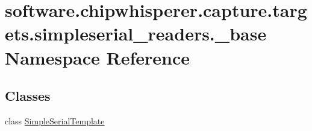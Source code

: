 \hypertarget{namespacesoftware_1_1chipwhisperer_1_1capture_1_1targets_1_1simpleserial__readers_1_1__base}{}\section{software.\+chipwhisperer.\+capture.\+targets.\+simpleserial\+\_\+readers.\+\_\+base Namespace Reference}
\label{namespacesoftware_1_1chipwhisperer_1_1capture_1_1targets_1_1simpleserial__readers_1_1__base}
\subsection*{Classes}
\begin{DoxyCompactItemize}
\item 
class \hyperlink{classsoftware_1_1chipwhisperer_1_1capture_1_1targets_1_1simpleserial__readers_1_1__base_1_1SimpleSerialTemplate}{Simple\+Serial\+Template}
\end{DoxyCompactItemize}
